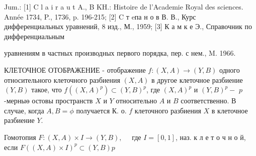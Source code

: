 \documentclass[10pt]{article}
\begin{document}
Jum.: [1] C l a i r a u t A., B KH.: Histoire de l'Academie Royal des sciences. Année 1734, P., 1736, p. 196-215; [2] C т eпа н о в В. В., Курс дифференциальных уравнений, 8 изд., М., 1959; [3] К а м к е Э., Справочник по дифференциальным

уравнениям в частных производных первого порядка, пер. с нем., M. 1966.



КЛЕТОЧНОЕ ОТОБРАЖЕНИЕ - отображение $f:(X, A) \rightarrow(Y, B)$ одного относительного клеточного разбиения $(X, A)$ в другое клеточное разбиение $(Y, B)$ такое, что $f\left((X, A)^{p}\right) \subset(Y, B)^{p}$, где $(X, A)^{p}$ и $(Y, B)^{p}-$ $p$-мерныө остовы пространств $X$ и $Y$ относительно $A$ и $B$ соответственно. В случае, когда $A, B=\phi$ получается К. о. $f$ клеточного разбиения $X$ в клеточное разбиение $Y$.



Гомотопия $F:(X, A) \times I \rightarrow(Y, B), \quad$ где $I=[0,1]$, наз. к л е т о ч н о й, если $F((X, A) \times I)^{p} \subset(Y, B) p$
\end{document}

